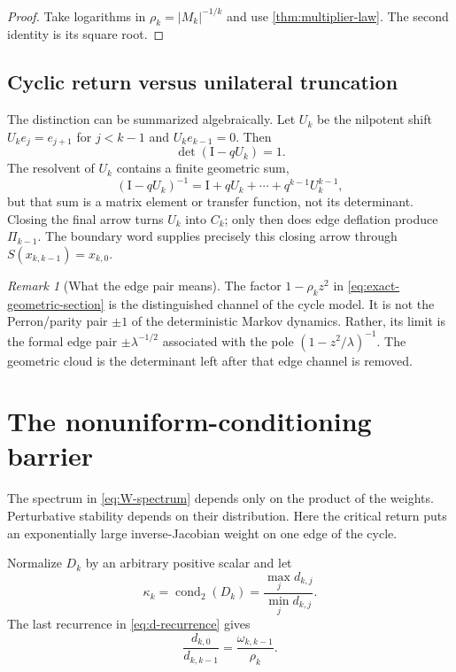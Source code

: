\documentclass[11pt]{article}
\theoremstyle{definition}
\theoremstyle{remark}
\newtheorem{remark}[theorem]{Remark}
\newcommand{\Id}{\mathrm I}
\newcommand{\cond}{\operatorname{cond}_2}
\begin{document}
\begin{proof}
Take logarithms in
$\rho_k=|M_k|^{-1/k}$ and use
\cref{thm:multiplier-law}.  The second identity is its square root.
\end{proof}

\subsection{Cyclic return versus unilateral truncation}

The distinction can be summarized algebraically.  Let $U_k$ be the
nilpotent shift $U_ke_j=e_{j+1}$ for $j<k-1$ and $U_ke_{k-1}=0$.  Then
\begin{equation}\label{eq:unilateral-determinant}
 \det(\Id-qU_k)=1.
\end{equation}
The resolvent of $U_k$ contains a finite geometric sum,
\begin{equation}\label{eq:unilateral-resolvent}
 (\Id-qU_k)^{-1}
 =\Id+qU_k+\cdots+q^{k-1}U_k^{k-1},
\end{equation}
but that sum is a matrix element or transfer function, not its determinant.
Closing the final arrow turns $U_k$ into $C_k$; only then does edge deflation
produce $\Pi_{k-1}$.  The boundary word supplies precisely this closing
arrow through $S(x_{k,k-1})=x_{k,0}$.

\begin{remark}[What the edge pair means]
\label{rem:edge-pair}
The factor $1-\rho_kz^2$ in
\eqref{eq:exact-geometric-section} is the distinguished channel of the cycle
model.  It is not the Perron/parity pair $\pm1$ of the deterministic Markov
dynamics.  Rather, its limit is the formal edge pair
$\pm\lambda^{-1/2}$ associated with the pole
$(1-z^2/\lambda)^{-1}$.  The geometric cloud is the determinant left after
that edge channel is removed.
\end{remark}

\section{The nonuniform-conditioning barrier}
\label{sec:conditioning}

The spectrum in \eqref{eq:W-spectrum} depends only on the product of the
weights.  Perturbative stability depends on their distribution.  Here the
critical return puts an exponentially large inverse-Jacobian weight on one
edge of the cycle.

Normalize $D_k$ by an arbitrary positive scalar and let
\begin{equation}\label{eq:D-condition}
 \kappa_k=\cond(D_k)
 =\frac{\max_jd_{k,j}}{\min_jd_{k,j}}.
\end{equation}
The last recurrence in \eqref{eq:d-recurrence} gives
\begin{equation}\label{eq:last-d-ratio}
 \frac{d_{k,0}}{d_{k,k-1}}
 =\frac{\omega_{k,k-1}}{\rho_k}.
\end{equation}
\end{document}
